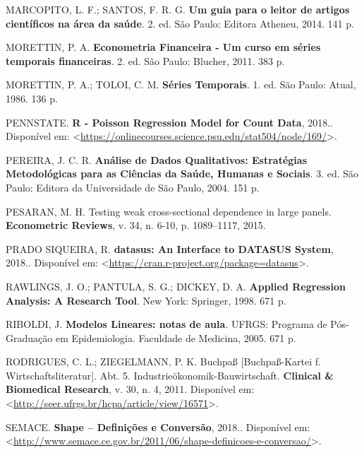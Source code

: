 \documentclass[12pt,brazil,oneside]{book}
\begin{document}
\leavevmode\hypertarget{ref-Marcopito2014}{}%
MARCOPITO, L. F.; SANTOS, F. R. G. \textbf{Um guia para o leitor de artigos científicos na área da saúde}. 2. ed. São Paulo: Editora Atheneu, 2014. 141 p.

\leavevmode\hypertarget{ref-morettin2011}{}%
MORETTIN, P. A. \textbf{Econometria Financeira - Um curso em séries temporais financeiras}. 2. ed. São Paulo: Blucher, 2011. 383 p.

\leavevmode\hypertarget{ref-morettin1986}{}%
MORETTIN, P. A.; TOLOI, C. M. \textbf{Séries Temporais}. 1. ed. São Paulo: Atual, 1986. 136 p.

\leavevmode\hypertarget{ref-penn2018}{}%
PENNSTATE. \textbf{R - Poisson Regression Model for Count Data}, 2018.. Disponível em: \textless{}\url{https://onlinecourses.science.psu.edu/stat504/node/169/}\textgreater{}.

\leavevmode\hypertarget{ref-Pereira2004a}{}%
PEREIRA, J. C. R. \textbf{Análise de Dados Qualitativos: Estratégias Metodológicas para as Ciências da Saúde, Humanas e Sociais}. 3. ed. São Paulo: Editora da Universidade de São Paulo, 2004. 151 p.

\leavevmode\hypertarget{ref-pesaran2015}{}%
PESARAN, M. H. Testing weak cross-sectional dependence in large panels. \textbf{Econometric Reviews}, v. 34, n. 6-10, p. 1089--1117, 2015.

\leavevmode\hypertarget{ref-datasus}{}%
PRADO SIQUEIRA, R. \textbf{datasus: An Interface to DATASUS System}, 2018.. Disponível em: \textless{}\url{https://cran.r-project.org/package=datasus}\textgreater{}.

\leavevmode\hypertarget{ref-Rawlings1998}{}%
RAWLINGS, J. O.; PANTULA, S. G.; DICKEY, D. A. \textbf{Applied Regression Analysis: A Research Tool}. New York: Springer, 1998. 671 p.

\leavevmode\hypertarget{ref-Riboldi2005}{}%
RIBOLDI, J. \textbf{Modelos Lineares: notas de aula}. UFRGS: Programa de Pós-Graduação em Epidemiologia. Faculdade de Medicina, 2005. 671 p.

\leavevmode\hypertarget{ref-Rodrigues2011}{}%
RODRIGUES, C. L.; ZIEGELMANN, P. K. Buchpaß {[}Buchpaß-Kartei f. Wirtschaftsliteratur{]}. Abt. 5. Industrieökonomik-Bauwirtschaft. \textbf{Clinical \& Biomedical Research}, v. 30, n. 4, 2011. Disponível em: \textless{}\url{http://seer.ufrgs.br/hcpa/article/view/16571}\textgreater{}.

\leavevmode\hypertarget{ref-Semace2018}{}%
SEMACE. \textbf{Shape -- Definições e Conversão}, 2018.. Disponível em: \textless{}\url{http://www.semace.ce.gov.br/2011/06/shape-definicoes-e-conversao/}\textgreater{}.
\end{document}
